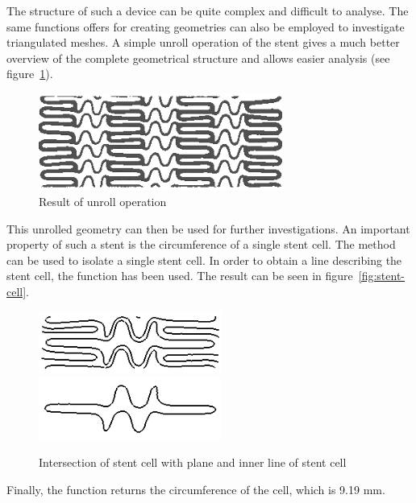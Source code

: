 The structure of such a device can be quite complex and difficult to analyse. The same functions \pyf offers for creating geometries can also be employed to investigate triangulated meshes. A simple unroll operation of the stent gives a much better overview of the complete geometrical structure and allows easier analysis (see figure~\ref{fig:cypher-stent-unroll}).
 

\begin{figure}[h]
  \centering
  \begin{makeimage}
  \end{makeimage}
  \begin{latexonly}
    \includegraphics[width=8cm]{images/cypher-stent-unroll}
  \end{latexonly}
  \begin{htmlonly}
  \end{htmlonly}  
  \caption{Result of unroll operation}
  \label{fig:cypher-stent-unroll}
\end{figure}

This unrolled geometry can then be used for further investigations. An important property of such a stent is the circumference of a single stent cell. The  method can be used to isolate a single stent cell. In order to obtain a line describing the stent cell, the function  has been used. The result can be seen in figure~\ref{fig:stent-cell}.

\begin{figure}[h]
  \centering
  \begin{makeimage}
  \end{makeimage}
  \begin{latexonly}
    \includegraphics[width=6cm]{images/stent-cell-full}    
    \includegraphics[width=6cm]{images/stent-cell}
  \end{latexonly}
  \begin{htmlonly}
  \end{htmlonly}  
  \caption{Intersection of stent cell with plane and inner line of stent cell}
  \label{fig:stent-cell-cell}
\end{figure}

Finally, the  function returns the circumference of the cell, which is 9.19 mm.

